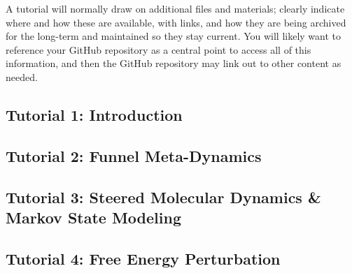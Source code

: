 \documentclass[9pt,tutorial]{livecoms}
\begin{document}
A tutorial will normally draw on additional files and materials; clearly indicate where and how these are available, with links, and how they are being archived for the long-term and maintained so they stay current.
You will likely want to reference your GitHub repository as a central point to access all of this information, and then the GitHub repository may link out to other content as needed.

\subsection{Tutorial 1: Introduction}






\subsection{Tutorial 2: Funnel Meta-Dynamics}

\subsection{Tutorial 3: Steered Molecular Dynamics \& Markov State Modeling}

\subsection{Tutorial 4: Free Energy Perturbation}


%
%
\end{document}
